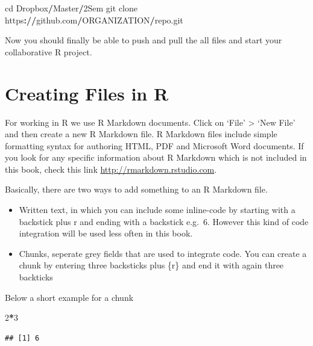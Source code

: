 \documentclass[]{report}
\newenvironment{Shaded}{\begin{snugshade}}{\end{snugshade}}
\newcommand{\DecValTok}[1]{\textcolor[rgb]{0.00,0.00,0.81}{#1}}
\newcommand{\OperatorTok}[1]{\textcolor[rgb]{0.81,0.36,0.00}{\textbf{#1}}}
\newcommand{\ErrorTok}[1]{\textcolor[rgb]{0.64,0.00,0.00}{\textbf{#1}}}
\newcommand{\NormalTok}[1]{#1}
\providecommand{\tightlist}{%
  \setlength{\itemsep}{0pt}\setlength{\parskip}{0pt}}
\begin{document}
\begin{Shaded}
\begin{Highlighting}[]
\NormalTok{cd Dropbox}\OperatorTok{/}\NormalTok{Master}\OperatorTok{/}\NormalTok{2Sem}
\NormalTok{git clone https}\OperatorTok{:}\ErrorTok{//}\NormalTok{github.com}\OperatorTok{/}\NormalTok{ORGANIZATION}\OperatorTok{/}\NormalTok{repo.git }
\end{Highlighting}
\end{Shaded}

Now you should finally be able to push and pull the all files and start
your collaborative R project.

\chapter{Creating Files in R}\label{creating-files-in-r}

For working in R we use R Markdown documents. Click on `File'
\textgreater{} `New File' and then create a new R Markdown file. R
Markdown files include simple formatting syntax for authoring HTML, PDF
and Microsoft Word documents. If you look for any specific information
about R Markdown which is not included in this book, check this link
\url{http://rmarkdown.rstudio.com}.

Basically, there are two ways to add something to an R Markdown file.

\begin{itemize}
\tightlist
\item
  Written text, in which you can include some inline-code by starting
  with a backstick plus r and ending with a backstick e.g.~6. However
  this kind of code integration will be used less often in this book.
\item
  Chunks, seperate grey fields that are used to integrate code. You can
  create a chunk by entering three backsticks plus \{r\} and end it with
  again three backticks
\end{itemize}

Below a short example for a chunk

\begin{Shaded}
\begin{Highlighting}[]
\DecValTok{2}\OperatorTok{*}\DecValTok{3}
\end{Highlighting}
\end{Shaded}

\begin{verbatim}
## [1] 6
\end{verbatim}
\end{document}
